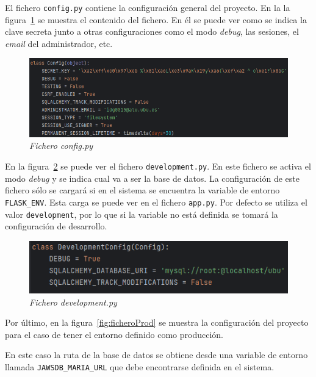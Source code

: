 El fichero \texttt{config.py} contiene la configuración general del proyecto. En la la figura~\ref{fig:ficheroConfig} se muestra el contenido del fichero. En él se puede ver como se indica la clave secreta junto a otras configuraciones como el modo \textit{debug}, las sesiones, el \textit{email} del administrador, etc.

\begin{figure}
	\centering
	\includegraphics[width=\textwidth]{../img/Anexos/ManualProgramador/config.png}
	\caption{\textit{Fichero config.py}}\label{fig:ficheroConfig}
\end{figure}

En la figura~\ref{fig:ficheroDev} se puede ver el fichero \texttt{development.py}. 
En este fichero se activa el modo \textit{debug} y se indica cual va a ser la base de datos. 
La configuración de este fichero sólo se cargará si en el sistema se encuentra la variable de entorno \texttt{FLASK\_ENV}. 
Esta carga se puede ver en el fichero \texttt{app.py}. 
Por defecto se utiliza el valor \texttt{development}, por lo que si la variable no está definida se tomará la configuración de desarrollo.

\begin{figure}
	\centering
	\includegraphics[width=\textwidth]{../img/Anexos/ManualProgramador/development.png}
	\caption{\textit{Fichero development.py}}\label{fig:ficheroDev}
\end{figure}

Por último, en la figura~\ref{fig:ficheroProd} se muestra la configuración del proyecto para el caso de tener el entorno definido como producción.

En este caso la ruta de la base de datos se obtiene desde una variable de entorno llamada \texttt{JAWSDB\_MARIA\_URL} que debe encontrarse definida en el sistema.

